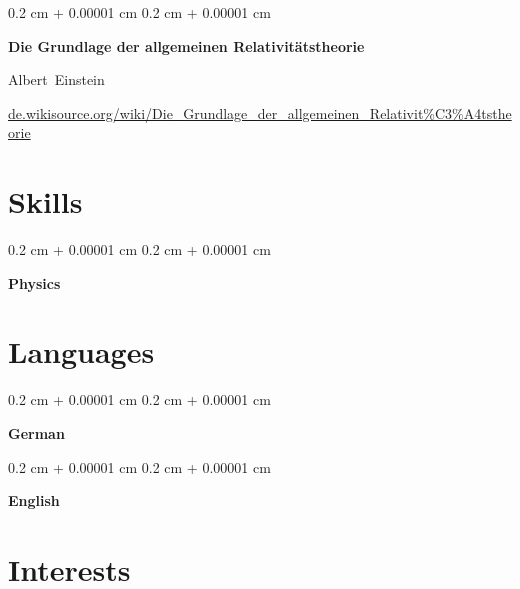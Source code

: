 \documentclass[10pt, letterpaper]{article}
\newenvironment{onecolentry}{
    \begin{adjustwidth}{
        0.2 cm + 0.00001 cm
    }{
        0.2 cm + 0.00001 cm
    }
}{
    \end{adjustwidth}
} %
\let\hrefWithoutArrow\href
\renewcommand{\href}[2]{\hrefWithoutArrow{#1}{\ifthenelse{\equal{#2}{}}{ }{#2 }\raisebox{.15ex}{\footnotesize \faExternalLink*}}}
\begin{document}
        \vspace{0.2 cm}

        \begin{samepage}
            \begin{onecolentry}
                \textbf{Die Grundlage der allgemeinen Relativitätstheorie}

                \vspace{0.10 cm}

                \mbox{Albert Einstein}
                \vspace{0.10 cm}

        \href{https://de.wikisource.org/wiki/Die_Grundlage_der_allgemeinen_Relativit%C3%A4tstheorie}{de.wikisource.org/wiki/Die\_Grundlage\_der\_allgemeinen\_Relativit\%C3\%A4tstheorie}    \end{onecolentry}
        \end{samepage}


    
    \section{Skills}



        
        \begin{onecolentry}
            \textbf{Physics}
        \end{onecolentry}



    
    \section{Languages}



        
        \begin{onecolentry}
            \textbf{German}
        \end{onecolentry}


        \vspace{0.2 cm}

        \begin{onecolentry}
            \textbf{English}
        \end{onecolentry}



    
    \section{Interests}
\end{document}
